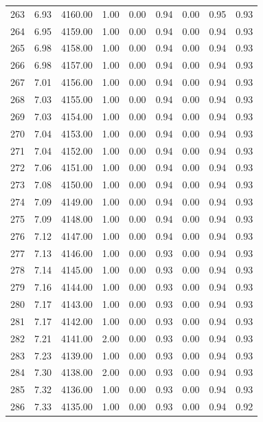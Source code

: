 \documentclass{article}\usepackage[]{graphicx}\usepackage[]{color}
\begin{document}
\begin{longtable}{rrrrrrrrr}
  263 & 6.93 & 4160.00 & 1.00 & 0.00 & 0.94 & 0.00 & 0.95 & 0.93 \\ 
  264 & 6.95 & 4159.00 & 1.00 & 0.00 & 0.94 & 0.00 & 0.94 & 0.93 \\ 
  265 & 6.98 & 4158.00 & 1.00 & 0.00 & 0.94 & 0.00 & 0.94 & 0.93 \\ 
  266 & 6.98 & 4157.00 & 1.00 & 0.00 & 0.94 & 0.00 & 0.94 & 0.93 \\ 
  267 & 7.01 & 4156.00 & 1.00 & 0.00 & 0.94 & 0.00 & 0.94 & 0.93 \\ 
  268 & 7.03 & 4155.00 & 1.00 & 0.00 & 0.94 & 0.00 & 0.94 & 0.93 \\ 
  269 & 7.03 & 4154.00 & 1.00 & 0.00 & 0.94 & 0.00 & 0.94 & 0.93 \\ 
  270 & 7.04 & 4153.00 & 1.00 & 0.00 & 0.94 & 0.00 & 0.94 & 0.93 \\ 
  271 & 7.04 & 4152.00 & 1.00 & 0.00 & 0.94 & 0.00 & 0.94 & 0.93 \\ 
  272 & 7.06 & 4151.00 & 1.00 & 0.00 & 0.94 & 0.00 & 0.94 & 0.93 \\ 
  273 & 7.08 & 4150.00 & 1.00 & 0.00 & 0.94 & 0.00 & 0.94 & 0.93 \\ 
  274 & 7.09 & 4149.00 & 1.00 & 0.00 & 0.94 & 0.00 & 0.94 & 0.93 \\ 
  275 & 7.09 & 4148.00 & 1.00 & 0.00 & 0.94 & 0.00 & 0.94 & 0.93 \\ 
  276 & 7.12 & 4147.00 & 1.00 & 0.00 & 0.94 & 0.00 & 0.94 & 0.93 \\ 
  277 & 7.13 & 4146.00 & 1.00 & 0.00 & 0.93 & 0.00 & 0.94 & 0.93 \\ 
  278 & 7.14 & 4145.00 & 1.00 & 0.00 & 0.93 & 0.00 & 0.94 & 0.93 \\ 
  279 & 7.16 & 4144.00 & 1.00 & 0.00 & 0.93 & 0.00 & 0.94 & 0.93 \\ 
  280 & 7.17 & 4143.00 & 1.00 & 0.00 & 0.93 & 0.00 & 0.94 & 0.93 \\ 
  281 & 7.17 & 4142.00 & 1.00 & 0.00 & 0.93 & 0.00 & 0.94 & 0.93 \\ 
  282 & 7.21 & 4141.00 & 2.00 & 0.00 & 0.93 & 0.00 & 0.94 & 0.93 \\ 
  283 & 7.23 & 4139.00 & 1.00 & 0.00 & 0.93 & 0.00 & 0.94 & 0.93 \\ 
  284 & 7.30 & 4138.00 & 2.00 & 0.00 & 0.93 & 0.00 & 0.94 & 0.93 \\ 
  285 & 7.32 & 4136.00 & 1.00 & 0.00 & 0.93 & 0.00 & 0.94 & 0.93 \\ 
  286 & 7.33 & 4135.00 & 1.00 & 0.00 & 0.93 & 0.00 & 0.94 & 0.92 \\ 

\end{longtable}
\end{document}
